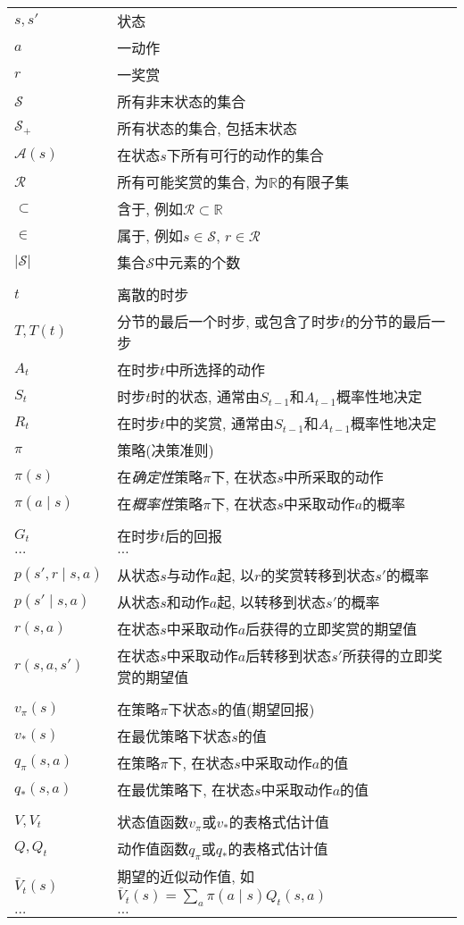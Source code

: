 \begin{longtable}[l]{p{6em}l}
$s, s'$ & 状态 \\
$a$ & 一动作 \\
$r$ & 一奖赏 \\
$\mathcal{S}$ & 所有非末状态的集合 \\
$\mathcal{S}_+$ & 所有状态的集合, 包括末状态 \\
$\mathcal{A}(s)$ & 在状态$s$下所有可行的动作的集合 \\
$\mathcal{R}$ & 所有可能奖赏的集合, 为$\mathbb{R}$的有限子集 \\
$\subset$ & 含于, 例如$\mathcal{R} \subset \mathbb{R}$ \\
$\in$ & 属于, 例如$s \in \mathcal{S}$, $r \in \mathcal{R}$ \\
$\lvert \mathcal{S} \rvert$ & 集合$\mathcal{S}$中元素的个数 \\
 & \\
$t$ & 离散的时步 \\
$T, T(t)$ & 分节的最后一个时步, 或包含了时步$t$的分节的最后一步 \\
$A_t$ & 在时步$t$中所选择的动作 \\
$S_t$ & 时步$t$时的状态, 通常由$S_{t - 1}$和$A_{t - 1}$概率性地决定 \\
$R_t$ & 在时步$t$中的奖赏, 通常由$S_{t - 1}$和$A_{t - 1}$概率性地决定 \\
$\pi$ & 策略(决策准则) \\
$\pi(s)$ & 在\emph{确定性}策略$\pi$下, 在状态$s$中所采取的动作 \\
$\pi(a \mid s)$ & 在\emph{概率性}策略$\pi$下, 在状态$s$中采取动作$a$的概率 \\
 & \\
$G_t$ & 在时步$t$后的回报 \\
$\dots$ & $\dots$ \\
 & \\
$p(s', r \mid s, a)$ & 从状态$s$与动作$a$起, 以$r$的奖赏转移到状态$s'$的概率 \\
$p(s' \mid s, a)$ & 从状态$s$和动作$a$起, 以转移到状态$s'$的概率 \\
$r(s, a)$ & 在状态$s$中采取动作$a$后获得的立即奖赏的期望值 \\
$r(s, a, s')$ & 在状态$s$中采取动作$a$后转移到状态$s'$所获得的立即奖赏的期望值 \\
 & \\
$v_\pi(s)$ & 在策略$\pi$下状态$s$的值(期望回报) \\
$v_*(s)$ & 在最优策略下状态$s$的值 \\
$q_\pi(s, a)$ & 在策略$\pi$下, 在状态$s$中采取动作$a$的值 \\
$q_*(s, a)$ & 在最优策略下, 在状态$s$中采取动作$a$的值 \\
 & \\
$V, V_t$ & 状态值函数$v_\pi$或$v_*$的表格式估计值 \\
$Q, Q_t$ & 动作值函数$q_\pi$或$q_*$的表格式估计值 \\
$\bar{V}_t(s)$ & 期望的近似动作值, 如$\bar{V}_t(s) = \sum_a \pi(a \mid s) Q_t(s, a)$ \\
$\dots$ & $\dots$
\end{longtable}
